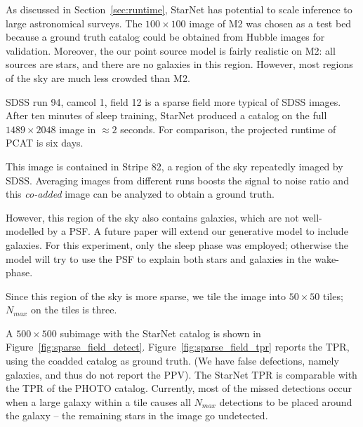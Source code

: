 As discussed in Section~\ref{sec:runtime}, StarNet has potential to scale inference to large astronomical surveys. 
The $100\times100$ image of M2 was chosen as a test bed because a ground truth catalog
could be obtained from Hubble images for validation. 
Moreover, the our point source model is fairly realistic on M2: 
all sources are stars, and there are no galaxies in this region. 
However, most regions of the sky are much less crowded than M2.

SDSS run 94, camcol 1, field  12 is a sparse field more typical of SDSS images. 
After ten minutes of sleep training, StarNet produced a catalog on the full $1489\times 2048$ image in $\approx2$ seconds. For comparison, the projected runtime of PCAT is six days.  

This image is contained in Stripe 82, a region of the sky repeatedly imaged by SDSS. Averaging images from different runs boosts the signal to noise ratio and this {\itshape co-added} image can be analyzed to obtain a ground truth. 

However, this region of the sky also contains galaxies, which are 
not well-modelled by a PSF. A future paper will extend our generative model to include galaxies. For this experiment, only the sleep phase was employed; 
otherwise the model will try to use the PSF to explain both stars and galaxies in the wake-phase. 

Since this region of the sky is more sparse, we tile the image into $50\times 50$ tiles; $N_{max}$ on the tiles is three. 

A $500\times 500$ subimage with the StarNet catalog is shown in 
Figure~\ref{fig:sparse_field_detect}.
Figure~\ref{fig:sparse_field_tpr} reports the TPR, using the coadded catalog as ground truth. 
(We have false defections, namely galaxies, and thus 
do not report the PPV).
The StarNet TPR is comparable with the TPR of the PHOTO catalog. 
Currently, most of the missed detections occur when a large galaxy within a tile causes all $N_{max}$ detections to be placed around the galaxy -- the remaining stars in the image go undetected. 


